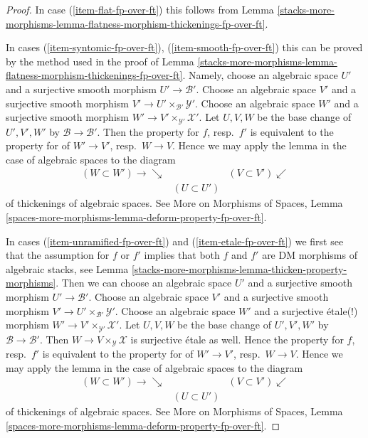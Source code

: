 \begin{proof}
In case (\ref{item-flat-fp-over-ft}) this follows from
Lemma \ref{stacks-more-morphisms-lemma-flatness-morphism-thickenings-fp-over-ft}.

\medskip\noindent
In cases
(\ref{item-syntomic-fp-over-ft}), (\ref{item-smooth-fp-over-ft})
this can be proved by the method used in the proof of
Lemma \ref{stacks-more-morphisms-lemma-flatness-morphism-thickenings-fp-over-ft}.
Namely, choose an algebraic space $U'$ and a surjective smooth morphism
$U' \to \mathcal{B}'$.
Choose an algebraic space $V'$ and a surjective smooth morphism
$V' \to U' \times_{\mathcal{B}'} \mathcal{Y}'$.
Choose an algebraic space $W'$ and a surjective smooth morphism
$W' \to V' \times_{\mathcal{Y}'} \mathcal{X}'$. Let $U, V, W$
be the base change of $U', V', W'$ by $\mathcal{B} \to \mathcal{B}'$.
Then the property for $f$, resp.\ $f'$
is equivalent to the property for of $W' \to V'$, resp.\ $W \to V$.
Hence we may apply the lemma in the case of algebraic spaces to the
diagram
$$
\begin{array}{ccc}(W \subset W') \longrightarrow\searrow &  & (V \subset V') \swarrow \\  & (U \subset U') & \end{array}
$$
of thickenings of algebraic spaces. See
More on Morphisms of Spaces, Lemma
\ref{spaces-more-morphisms-lemma-deform-property-fp-over-ft}.

\medskip\noindent
In cases (\ref{item-unramified-fp-over-ft}) and (\ref{item-etale-fp-over-ft})
we first see that the assumption for $f$ or $f'$ implies that both
$f$ and $f'$ are DM morphisms of algebraic stacks, see
Lemma \ref{stacks-more-morphisms-lemma-thicken-property-morphisms}. Then we can choose
an algebraic space $U'$ and a surjective smooth morphism
$U' \to \mathcal{B}'$.
Choose an algebraic space $V'$ and a surjective smooth morphism
$V' \to U' \times_{\mathcal{B}'} \mathcal{Y}'$.
Choose an algebraic space $W'$ and a surjective \'etale(!) morphism
$W' \to V' \times_{\mathcal{Y}'} \mathcal{X}'$. Let $U, V, W$
be the base change of $U', V', W'$ by $\mathcal{B} \to \mathcal{B}'$.
Then $W \to V \times_\mathcal{Y} \mathcal{X}$ is surjective
\'etale as well. Hence the property for $f$, resp.\ $f'$
is equivalent to the property for of $W' \to V'$, resp.\ $W \to V$.
Hence we may apply the lemma in the case of algebraic spaces to the
diagram
$$
\begin{array}{ccc}(W \subset W') \longrightarrow\searrow &  & (V \subset V') \swarrow \\  & (U \subset U') & \end{array}
$$
of thickenings of algebraic spaces. See
More on Morphisms of Spaces, Lemma
\ref{spaces-more-morphisms-lemma-deform-property-fp-over-ft}.


\end{proof}
